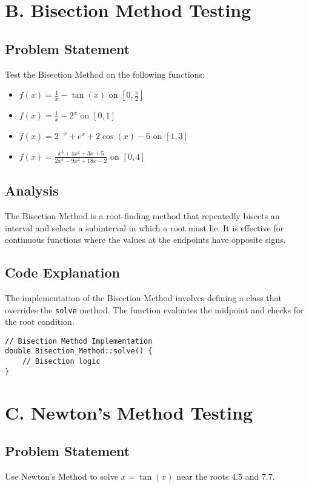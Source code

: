 \documentclass{article}
\begin{document}
\section{B. Bisection Method Testing}
\subsection{Problem Statement}
Test the Bisection Method on the following functions:
\begin{itemize}
    \item \( f(x) = \frac{1}{x} - \tan(x) \) on \([0, \frac{\pi}{2}]\)
    \item \( f(x) = \frac{1}{x} - 2^x \) on \([0, 1]\)
    \item \( f(x) = 2^{-x} + e^x + 2\cos(x) - 6 \) on \([1, 3]\)
    \item \( f(x) = \frac{x^3 + 4x^2 + 3x + 5}{2x^3 - 9x^2 + 18x - 2} \) on \([0, 4]\)
\end{itemize}

\subsection{Analysis}
The Bisection Method is a root-finding method that repeatedly bisects an interval and selects a subinterval in which a root must lie. It is effective for continuous functions where the values at the endpoints have opposite signs.

\subsection{Code Explanation}
The implementation of the Bisection Method involves defining a class that overrides the \texttt{solve} method. The function evaluates the midpoint and checks for the root condition.

\begin{verbatim}
// Bisection Method Implementation
double Bisection_Method::solve() {
    // Bisection logic
}
\end{verbatim}

\section{C. Newton's Method Testing}
\subsection{Problem Statement}
Use Newton's Method to solve \( x = \tan(x) \) near the roots \( 4.5 \) and \( 7.7 \).
\end{document}
